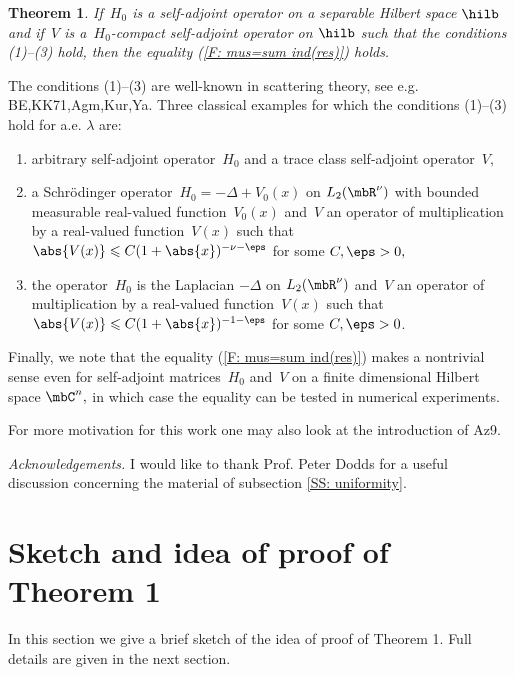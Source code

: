 \documentclass[11pt]{amsart}
\newtheorem{thm*}{Theorem}
\let\leq\leqslant
\numberwithin{equation}{section}
\begin{document}
\begin{thm*}
If~$H_0$ is a self-adjoint operator on a separable Hilbert space
$\hilb$ and if~$V$ is a~$H_0$-compact self-adjoint operator on
$\hilb$ such that the conditions (1)--(3) hold, then the equality
(\ref{F: mus=sum ind(res)}) holds.
\end{thm*}
The conditions (1)--(3) are well-known in scattering theory, see
e.g. {\futurelet\NChar\CleverCite}{BE,KK71,Agm,Kur,Ya}. Three classical examples for which
the conditions (1)--(3) hold for a.e. $\lambda$ are:
\begin{enumerate}
  \item arbitrary self-adjoint operator~$H_0$ and a trace
class self-adjoint operator~$V,$
  \item a Schr\"odinger operator~$H_0 = -\Delta +
V_0(x)$ on $L_2(\mbR^\nu)$ with bounded measurable real-valued
function~$V_0(x)$ and~$V$ an operator of multiplication by a real-valued
function~$V(x)$ such that $\abs{V(x)} \leq C
(1+\abs{x})^{-\nu-\eps}$ for some $C,\eps>0,$
 \item the operator~$H_0$ is the Laplacian $-\Delta$ on $L_2(\mbR^\nu)$ and~$V$ an operator of multiplication by a real-valued
function~$V(x)$ such that $\abs{V(x)} \leq C
(1+\abs{x})^{-1-\eps}$ for some $C,\eps>0$.
\end{enumerate}

Finally, we note that the equality (\ref{F: mus=sum ind(res)})
makes a nontrivial sense even for self-adjoint matrices~$H_0$
and~$V$ on a finite dimensional Hilbert
space $\mbC^n,$ in which case the equality can be tested in numerical experiments. 

For more motivation for this work one may also look at the introduction of {\futurelet\NChar\CleverCite}{Az9}.

\bigskip
{\it Acknowledgements.} I would like to thank Prof. Peter Dodds for a useful discussion
concerning the material of subsection \ref{SS: uniformity}.

\section{Sketch and idea of proof of Theorem 1}
In this section we give a brief sketch of the idea of proof of Theorem 1.
Full details are given in the next section.
\end{document}
